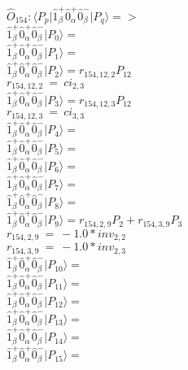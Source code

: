 \documentclass[14pt]{article}
\begin{document}
    $\hat{O}_{154}:  \langle{P_p}\vert \hat{1}_{\beta}^{+}\hat{0}_{\alpha}^{+}\hat{0}_{\beta}^{-} \vert{P_q}\rangle => $ \\ 
    $ \hat{1}_{\beta}^{+}\hat{0}_{\alpha}^{+}\hat{0}_{\beta}^{-} \vert{P_{0}}\rangle =  $ \\ 
    $ \hat{1}_{\beta}^{+}\hat{0}_{\alpha}^{+}\hat{0}_{\beta}^{-} \vert{P_{1}}\rangle =  $ \\ 
    $ \hat{1}_{\beta}^{+}\hat{0}_{\alpha}^{+}\hat{0}_{\beta}^{-} \vert{P_{2}}\rangle = {r}_{154,12,2}P_{12} $ \\ 
    ${r}_{154,12,2}\ =\ {ci}_{2,3} $ \\ 
    $ \hat{1}_{\beta}^{+}\hat{0}_{\alpha}^{+}\hat{0}_{\beta}^{-} \vert{P_{3}}\rangle = {r}_{154,12,3}P_{12} $ \\ 
    ${r}_{154,12,3}\ =\ {ci}_{3,3} $ \\ 
    $ \hat{1}_{\beta}^{+}\hat{0}_{\alpha}^{+}\hat{0}_{\beta}^{-} \vert{P_{4}}\rangle =  $ \\ 
    $ \hat{1}_{\beta}^{+}\hat{0}_{\alpha}^{+}\hat{0}_{\beta}^{-} \vert{P_{5}}\rangle =  $ \\ 
    $ \hat{1}_{\beta}^{+}\hat{0}_{\alpha}^{+}\hat{0}_{\beta}^{-} \vert{P_{6}}\rangle =  $ \\ 
    $ \hat{1}_{\beta}^{+}\hat{0}_{\alpha}^{+}\hat{0}_{\beta}^{-} \vert{P_{7}}\rangle =  $ \\ 
    $ \hat{1}_{\beta}^{+}\hat{0}_{\alpha}^{+}\hat{0}_{\beta}^{-} \vert{P_{8}}\rangle =  $ \\ 
    $ \hat{1}_{\beta}^{+}\hat{0}_{\alpha}^{+}\hat{0}_{\beta}^{-} \vert{P_{9}}\rangle = {r}_{154,2,9}P_{2}+{r}_{154,3,9}P_{3} $ \\ 
    ${r}_{154,2,9}\ =\ -1.0*{inv}_{2,2} $ \\ 
    ${r}_{154,3,9}\ =\ -1.0*{inv}_{2,3} $ \\ 
    $ \hat{1}_{\beta}^{+}\hat{0}_{\alpha}^{+}\hat{0}_{\beta}^{-} \vert{P_{10}}\rangle =  $ \\ 
    $ \hat{1}_{\beta}^{+}\hat{0}_{\alpha}^{+}\hat{0}_{\beta}^{-} \vert{P_{11}}\rangle =  $ \\ 
    $ \hat{1}_{\beta}^{+}\hat{0}_{\alpha}^{+}\hat{0}_{\beta}^{-} \vert{P_{12}}\rangle =  $ \\ 
    $ \hat{1}_{\beta}^{+}\hat{0}_{\alpha}^{+}\hat{0}_{\beta}^{-} \vert{P_{13}}\rangle =  $ \\ 
    $ \hat{1}_{\beta}^{+}\hat{0}_{\alpha}^{+}\hat{0}_{\beta}^{-} \vert{P_{14}}\rangle =  $ \\ 
    $ \hat{1}_{\beta}^{+}\hat{0}_{\alpha}^{+}\hat{0}_{\beta}^{-} \vert{P_{15}}\rangle =  $ \\ 
    
\end{document}
